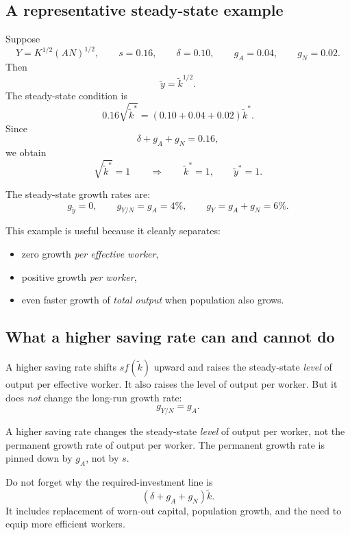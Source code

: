 \documentclass[12pt]{article}
\begin{document}
\subsection{A representative steady-state example}

\begin{examplebox}[title={Worked Example: Steady state with technology and population growth}]
Suppose
\[
Y=K^{1/2}(AN)^{1/2},
\qquad
s=0.16,
\qquad
\delta=0.10,
\qquad
g_A=0.04,
\qquad
g_N=0.02.
\]
Then
\[
\tilde{y}=\tilde{k}^{1/2}.
\]
The steady-state condition is
\[
0.16\sqrt{\tilde{k}^*}=(0.10+0.04+0.02)\tilde{k}^*.
\]
Since
\[
\delta+g_A+g_N=0.16,
\]
we obtain
\[
\sqrt{\tilde{k}^*}=1
\qquad\Rightarrow\qquad
\tilde{k}^*=1,
\qquad
\tilde{y}^*=1.
\]

The steady-state growth rates are:
\[
g_{\tilde{y}}=0,
\qquad
g_{Y/N}=g_A=4\%,
\qquad
g_Y=g_A+g_N=6\%.
\]

This example is useful because it cleanly separates:
\begin{itemize}[leftmargin=1.5em]
\item zero growth \emph{per effective worker},
\item positive growth \emph{per worker},
\item even faster growth of \emph{total output} when population also grows.
\end{itemize}
\end{examplebox}

\subsection{What a higher saving rate can and cannot do}

A higher saving rate shifts \(sf(\tilde{k})\) upward and raises the steady-state \emph{level} of output per effective worker. It also raises the level of output per worker. But it does \emph{not} change the long-run growth rate:
\[
g_{Y/N}=g_A.
\]

\begin{commonmistake}
A higher saving rate changes the steady-state \emph{level} of output per worker, not the permanent growth rate of output per worker. The permanent growth rate is pinned down by \(g_A\), not by \(s\).
\end{commonmistake}

\begin{commonmistake}
Do not forget why the required-investment line is
\[
(\delta+g_A+g_N)\tilde{k}.
\]
It includes replacement of worn-out capital, population growth, and the need to equip more efficient workers.
\end{commonmistake}
\end{document}
